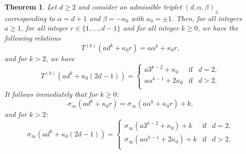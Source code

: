 \documentclass[11pt,a4paper]{article}
\newtheorem{theorem}{Theorem}[section]
\begin{document}
\begin{theorem} 
	Let $d\geq 2$ and consider     an admissible  triplet  $(d,\alpha,\beta)_{\pmb{\pm}}$  corresponding to   $\alpha=d+1$ and  $\beta=-\kappa_0$  with $\kappa_0=\pm 1$. 	Then, 	for all integers $a\geq 1$, for all integer $r\in\{1,\ldots, d-1\} $ and  for all integer $k\geq 0$, we have  the following relations 
	\begin{equation}\label{T(adk+kappa0 r)-(d,d+1,1,kappa0)}
		T^{(k)}(ad^k+\kappa_0 r)=a\alpha^k+\kappa_0r,
	\end{equation} 	
	and for $k>2$, we have
	\begin{equation}\label{T(adk+kappa0 (2d-1))-(d,d+1,1,kappa0)}
		T^{(k)}(ad^k+\kappa_0 (2d-1))=\left\{\begin{array}{lll}
			a3^{k-2} +\kappa_0 &\mathrm{if}& d=2,\\
			a\alpha^{k-1}+2\kappa_0 &\mathrm{if}& d>2,\\
		\end{array}\right.
	\end{equation}
	It follows immediately  that for $k\geq 0$:
	\begin{equation}\label{sigma(adk+kappa0 r)-(d,d+1,1,kappa0)}
		\sigma_\infty(ad^k+\kappa_0 r)=\sigma_\infty(a\alpha^k+\kappa_0 r)+k,
	\end{equation} 	
	and  for $k>2$:
	\begin{equation}\label{sigma(adk+kappa0 (2d-1))-(d,d+1,1,kappa0)}
		\sigma_\infty(ad^k+\kappa_0 (2d-1))=\left\{\begin{array}{lll}
			\sigma_\infty(a3^{k-2}+\kappa_0)+k &\mathrm{if}& d=2,\\
			\sigma_\infty(a\alpha^{k-1}+2\kappa_0)+k  &\mathrm{if}& d>2.\\
		\end{array}\right.
	\end{equation}
\end{theorem}
\end{document}
